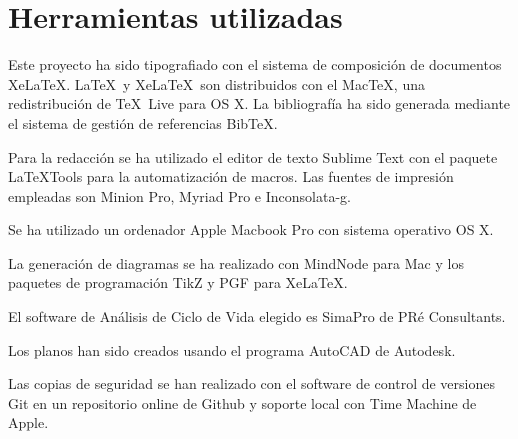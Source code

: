 \chapter{Herramientas utilizadas}\label{apend:herramientas}

Este proyecto ha sido tipografiado con el sistema de composición de documentos Xe\LaTeX. \LaTeX\ y Xe\LaTeX\ son distribuidos con el Mac\TeX, una redistribución de \TeX\ Live para OS X. La bibliografía ha sido generada mediante el sistema de gestión de referencias Bib\TeX.

Para la redacción se ha utilizado el editor de texto Sublime Text con el paquete LaTeXTools para la automatización de macros. Las fuentes de impresión empleadas son Minion Pro, Myriad Pro e Inconsolata-g.

Se ha utilizado un ordenador Apple Macbook Pro con sistema operativo OS X.

La generación de diagramas se ha realizado con MindNode para Mac y los paquetes de programación TikZ y PGF para Xe\LaTeX.

El software de Análisis de Ciclo de Vida elegido es SimaPro de PRé Consultants.

Los planos han sido creados usando el programa AutoCAD de Autodesk.

Las copias de seguridad se han realizado con el software de control de versiones Git en un repositorio online de Github y soporte local con Time Machine de Apple.
